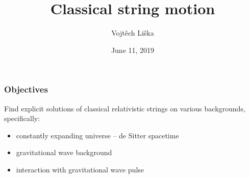 \documentclass[11pt]{beamer}
\title[Classical string motion]{Classical string motion} %
\author{Vojtěch Liška} %
\institute[PřF MUNI] %
{
Masaryk University, Faculty of Science \\ %
\medskip
\scriptsize{Supervisor: prof. Rikard von Unge}
}
\date{June 11, 2019}
\begin{document}
\begin{frame}[plain]
	\titlepage %
\end{frame}





\begin{frame}
	\frametitle{Objectives}
		Find explicit solutions of classical relativistic strings on various backgrounds, specifically:
		\begin{itemize}
			\item constantly expanding universe -- de Sitter spacetime
			\item gravitational wave background
			\item interaction with gravitational wave pulse
		\end{itemize}
\end{frame}
\end{document}
